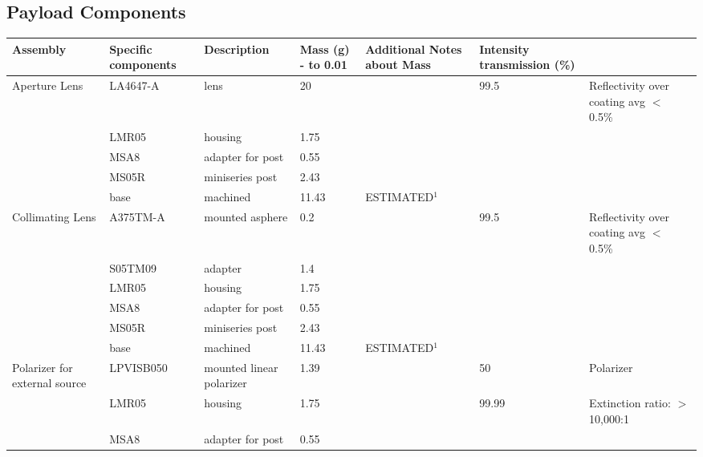 \documentclass[12pt]{article}
\begin{document}


\newpage

\begin{landscape}
\section{Payload Components} \label{app:payload_components}
\small
\begin{center}
\begin{longtable}{| p{3.25cm} | p{2.2cm} | p{3cm} | p{1.75cm} | p{2.5cm} | p{1.55cm} | p{5cm} |}
\hline
    \textbf{Assembly} & \textbf{Specific components} & \textbf{Description} & \textbf{Mass (g) - to 0.01} & \textbf{Additional Notes about Mass} & \textbf{Intensity transmission (\%)} &  \\ \hline 
    \midrule 
    \multirow{5}{*}{\parbox{3.25cm}{Aperture Lens}} & LA4647-A & lens  & 20    &       & 99.5  & Reflectivity over coating avg $<$ 0.5\% \\ 
          & LMR05 & housing & 1.75  &       &       &  \\
          & MSA8  & adapter for post & 0.55  &       &       &  \\
          & MS05R & miniseries post & 2.43  &       &       &  \\
          & base  & machined & 11.43 & ESTIMATED$^1$ &       &  \\ \hline
    \multirow{6}{*}{\parbox{3.25cm}{Collimating Lens}} & A375TM-A & mounted asphere & 0.2   &       & 99.5  & Reflectivity over coating avg $<$ 0.5\% \\ 
          & S05TM09 & adapter & 1.4   &       &       &  \\
          & LMR05 & housing & 1.75  &       &       &  \\
          & MSA8  & adapter for post & 0.55  &       &       &  \\
          & MS05R & miniseries post & 2.43  &       &       &  \\
          & base  & machined & 11.43 & ESTIMATED$^1$&       &  \\ \hline
    \multirow{5}{*}{\parbox{3.25cm}{Polarizer for external source}} & LPVISB050 & mounted linear polarizer & 1.39  &       & 50    & Polarizer \\ 
          & LMR05 & housing & 1.75  &       & 99.99 & Extinction ratio: $>$ 10,000:1 \\
          & MSA8  & adapter for post & 0.55  &       &       &  \\

\end{longtable}
\end{center}
\end{landscape}
\end{document}
